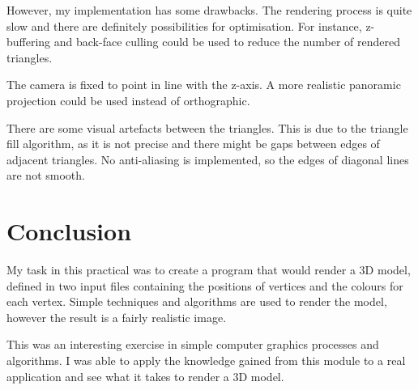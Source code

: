 \documentclass[]{article}
\begin{document}
However, my implementation has some drawbacks. The rendering process is quite slow and there are definitely possibilities for optimisation. For instance, z-buffering and back-face culling could be used to reduce the number of rendered triangles.

The camera is fixed to point in line with the z-axis. A more realistic panoramic projection could be used instead of orthographic.

There are some visual artefacts between the triangles. This is due to the triangle fill algorithm, as it is not precise and there might be gaps between edges of adjacent triangles. No anti-aliasing is implemented, so the edges of diagonal lines are not smooth.

\section{Conclusion}

My task in this practical was to create a program that would render a 3D model, defined in two input files containing the positions of vertices and the colours for each vertex. Simple techniques and algorithms are used to render the model, however the result is a fairly realistic image.

This was an interesting exercise in simple computer graphics processes and algorithms. I was able to apply the knowledge gained from this module to a real application and see what it takes to render a 3D model.
\end{document}
